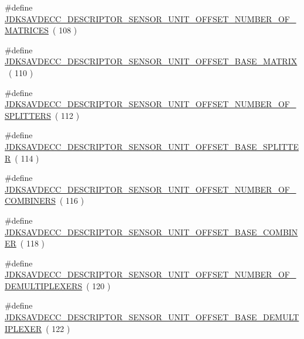 \begin{DoxyCompactItemize}
\item 
\#define \hyperlink{group__descriptor__sensor_gafe4a8b23c129b032580531faaba62b03}{J\+D\+K\+S\+A\+V\+D\+E\+C\+C\+\_\+\+D\+E\+S\+C\+R\+I\+P\+T\+O\+R\+\_\+\+S\+E\+N\+S\+O\+R\+\_\+\+U\+N\+I\+T\+\_\+\+O\+F\+F\+S\+E\+T\+\_\+\+N\+U\+M\+B\+E\+R\+\_\+\+O\+F\+\_\+\+M\+A\+T\+R\+I\+C\+ES}~( 108 )
\item 
\#define \hyperlink{group__descriptor__sensor_ga2c1c536543e43e3f19e7ee8558af433e}{J\+D\+K\+S\+A\+V\+D\+E\+C\+C\+\_\+\+D\+E\+S\+C\+R\+I\+P\+T\+O\+R\+\_\+\+S\+E\+N\+S\+O\+R\+\_\+\+U\+N\+I\+T\+\_\+\+O\+F\+F\+S\+E\+T\+\_\+\+B\+A\+S\+E\+\_\+\+M\+A\+T\+R\+IX}~( 110 )
\item 
\#define \hyperlink{group__descriptor__sensor_gaa603a955e448c0e12dcb707ba137e29e}{J\+D\+K\+S\+A\+V\+D\+E\+C\+C\+\_\+\+D\+E\+S\+C\+R\+I\+P\+T\+O\+R\+\_\+\+S\+E\+N\+S\+O\+R\+\_\+\+U\+N\+I\+T\+\_\+\+O\+F\+F\+S\+E\+T\+\_\+\+N\+U\+M\+B\+E\+R\+\_\+\+O\+F\+\_\+\+S\+P\+L\+I\+T\+T\+E\+RS}~( 112 )
\item 
\#define \hyperlink{group__descriptor__sensor_ga22d110e6147e15dbd483fa5163da0826}{J\+D\+K\+S\+A\+V\+D\+E\+C\+C\+\_\+\+D\+E\+S\+C\+R\+I\+P\+T\+O\+R\+\_\+\+S\+E\+N\+S\+O\+R\+\_\+\+U\+N\+I\+T\+\_\+\+O\+F\+F\+S\+E\+T\+\_\+\+B\+A\+S\+E\+\_\+\+S\+P\+L\+I\+T\+T\+ER}~( 114 )
\item 
\#define \hyperlink{group__descriptor__sensor_gae805ca2283a2544903a4d19310928031}{J\+D\+K\+S\+A\+V\+D\+E\+C\+C\+\_\+\+D\+E\+S\+C\+R\+I\+P\+T\+O\+R\+\_\+\+S\+E\+N\+S\+O\+R\+\_\+\+U\+N\+I\+T\+\_\+\+O\+F\+F\+S\+E\+T\+\_\+\+N\+U\+M\+B\+E\+R\+\_\+\+O\+F\+\_\+\+C\+O\+M\+B\+I\+N\+E\+RS}~( 116 )
\item 
\#define \hyperlink{group__descriptor__sensor_gaffbc47d9fab9b1b8f8d3a8960417396e}{J\+D\+K\+S\+A\+V\+D\+E\+C\+C\+\_\+\+D\+E\+S\+C\+R\+I\+P\+T\+O\+R\+\_\+\+S\+E\+N\+S\+O\+R\+\_\+\+U\+N\+I\+T\+\_\+\+O\+F\+F\+S\+E\+T\+\_\+\+B\+A\+S\+E\+\_\+\+C\+O\+M\+B\+I\+N\+ER}~( 118 )
\item 
\#define \hyperlink{group__descriptor__sensor_gaaca59613bdd041520bd6c15c6db6bf76}{J\+D\+K\+S\+A\+V\+D\+E\+C\+C\+\_\+\+D\+E\+S\+C\+R\+I\+P\+T\+O\+R\+\_\+\+S\+E\+N\+S\+O\+R\+\_\+\+U\+N\+I\+T\+\_\+\+O\+F\+F\+S\+E\+T\+\_\+\+N\+U\+M\+B\+E\+R\+\_\+\+O\+F\+\_\+\+D\+E\+M\+U\+L\+T\+I\+P\+L\+E\+X\+E\+RS}~( 120 )
\item 
\#define \hyperlink{group__descriptor__sensor_gac9473660ab131c8553061dfdb7c5395c}{J\+D\+K\+S\+A\+V\+D\+E\+C\+C\+\_\+\+D\+E\+S\+C\+R\+I\+P\+T\+O\+R\+\_\+\+S\+E\+N\+S\+O\+R\+\_\+\+U\+N\+I\+T\+\_\+\+O\+F\+F\+S\+E\+T\+\_\+\+B\+A\+S\+E\+\_\+\+D\+E\+M\+U\+L\+T\+I\+P\+L\+E\+X\+ER}~( 122 )

\end{DoxyCompactItemize}
